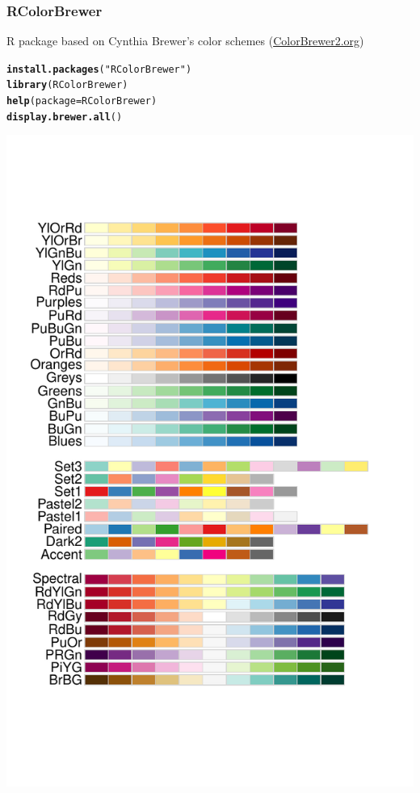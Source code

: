 \documentclass{beamer}\usepackage[]{graphicx}\usepackage[]{color}
\makeatletter
\newcommand{\hlstr}[1]{\textcolor[rgb]{0.192,0.494,0.8}{#1}}%
\newcommand{\hlstd}[1]{\textcolor[rgb]{0.345,0.345,0.345}{#1}}%
\newcommand{\hlkwc}[1]{\textcolor[rgb]{0.333,0.667,0.333}{#1}}%
\newcommand{\hlkwd}[1]{\textcolor[rgb]{0.737,0.353,0.396}{\textbf{#1}}}%
\newenvironment{kframe}{%
 \def\at@end@of@kframe{}%
 \ifinner\ifhmode%
  \def\at@end@of@kframe{\end{minipage}}%
  \begin{minipage}{\columnwidth}%
 \fi\fi%
 \def\FrameCommand##1{\hskip\@totalleftmargin \hskip-\fboxsep
 \colorbox{shadecolor}{##1}\hskip-\fboxsep
     \hskip-\linewidth \hskip-\@totalleftmargin \hskip\columnwidth}%
 \MakeFramed {\advance\hsize-\width
   \@totalleftmargin\z@ \linewidth\hsize
   \@setminipage}}%
 {\par\unskip\endMakeFramed%
 \at@end@of@kframe}
\newenvironment{knitrout}{}{} %
\makeatother
\begin{document}
\begin{frame}[fragile]
\frametitle{RColorBrewer}
R package based on Cynthia Brewer's color schemes (\url{ColorBrewer2.org})\\
\begin{minipage}{.45\linewidth}
\begin{knitrout}\scriptsize
{}\color{fgcolor}\begin{kframe}
\begin{alltt}
\hlkwd{install.packages}\hlstd{(}\hlstr{"RColorBrewer"}\hlstd{)}
\hlkwd{library}\hlstd{(RColorBrewer)}
\hlkwd{help}\hlstd{(}\hlkwc{package}\hlstd{=RColorBrewer)}
\hlkwd{display.brewer.all}\hlstd{()}
\end{alltt}
\end{kframe}
\end{knitrout}
\end{minipage}
\begin{minipage}{.45\linewidth}
\begin{knitrout}\footnotesize
{}\color{fgcolor}

{\centering \includegraphics[width=.9\linewidth]{figure/brewerloadpic} 

}



\end{knitrout}
\end{minipage}
\end{frame}
\end{document}
